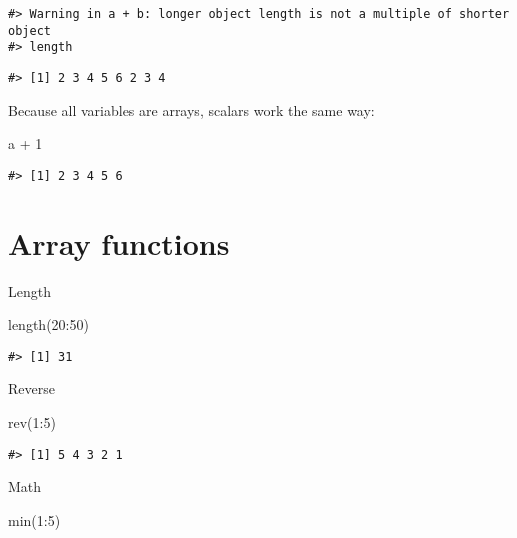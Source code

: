 \documentclass[
]{book}
\newenvironment{Shaded}{\begin{snugshade}}{\end{snugshade}}
\newcommand{\DecValTok}[1]{\textcolor[rgb]{0.00,0.00,0.81}{#1}}
\newcommand{\FunctionTok}[1]{\textcolor[rgb]{0.00,0.00,0.00}{#1}}
\newcommand{\NormalTok}[1]{#1}
\newcommand{\SpecialCharTok}[1]{\textcolor[rgb]{0.00,0.00,0.00}{#1}}
\begin{document}
\begin{verbatim}
#> Warning in a + b: longer object length is not a multiple of shorter object
#> length
\end{verbatim}

\begin{verbatim}
#> [1] 2 3 4 5 6 2 3 4
\end{verbatim}

Because all variables are arrays, scalars work the same way:

\begin{Shaded}
\begin{Highlighting}[]
\NormalTok{a }\SpecialCharTok{+} \DecValTok{1}
\end{Highlighting}
\end{Shaded}

\begin{verbatim}
#> [1] 2 3 4 5 6
\end{verbatim}

\hypertarget{array-functions}{%
\section{Array functions}\label{array-functions}}

Length

\begin{Shaded}
\begin{Highlighting}[]
\FunctionTok{length}\NormalTok{(}\DecValTok{20}\SpecialCharTok{:}\DecValTok{50}\NormalTok{)}
\end{Highlighting}
\end{Shaded}

\begin{verbatim}
#> [1] 31
\end{verbatim}

Reverse

\begin{Shaded}
\begin{Highlighting}[]
\FunctionTok{rev}\NormalTok{(}\DecValTok{1}\SpecialCharTok{:}\DecValTok{5}\NormalTok{)}
\end{Highlighting}
\end{Shaded}

\begin{verbatim}
#> [1] 5 4 3 2 1
\end{verbatim}

Math

\begin{Shaded}
\begin{Highlighting}[]
\FunctionTok{min}\NormalTok{(}\DecValTok{1}\SpecialCharTok{:}\DecValTok{5}\NormalTok{)}
\end{Highlighting}
\end{Shaded}
\end{document}
